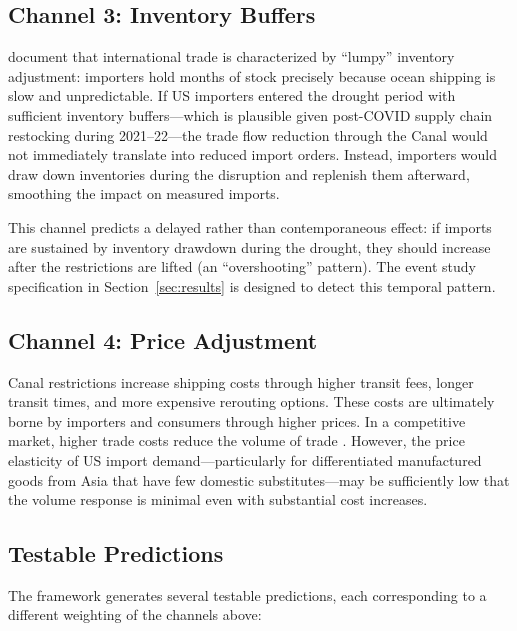 \documentclass[12pt]{article}
\begin{document}
\subsection{Channel 3: Inventory Buffers}

\citet{alessandria2010inventories} document that international trade is characterized by ``lumpy'' inventory adjustment: importers hold months of stock precisely because ocean shipping is slow and unpredictable. If US importers entered the drought period with sufficient inventory buffers---which is plausible given post-COVID supply chain restocking during 2021--22---the trade flow reduction through the Canal would not immediately translate into reduced import orders. Instead, importers would draw down inventories during the disruption and replenish them afterward, smoothing the impact on measured imports.

This channel predicts a delayed rather than contemporaneous effect: if imports are sustained by inventory drawdown during the drought, they should increase after the restrictions are lifted (an ``overshooting'' pattern). The event study specification in Section~\ref{sec:results} is designed to detect this temporal pattern.

\subsection{Channel 4: Price Adjustment}

Canal restrictions increase shipping costs through higher transit fees, longer transit times, and more expensive rerouting options. These costs are ultimately borne by importers and consumers through higher prices. In a competitive market, higher trade costs reduce the volume of trade \citep{anderson2004trade}. However, the price elasticity of US import demand---particularly for differentiated manufactured goods from Asia that have few domestic substitutes---may be sufficiently low that the volume response is minimal even with substantial cost increases.

\subsection{Testable Predictions}

The framework generates several testable predictions, each corresponding to a different weighting of the channels above:
\end{document}
